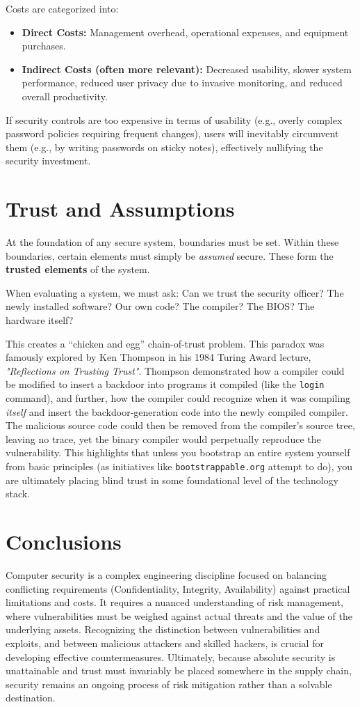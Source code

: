 Costs are categorized into:
\begin{itemize}
    \item \textbf{Direct Costs:} Management overhead, operational expenses, and equipment purchases.
    \item \textbf{Indirect Costs (often more relevant):} Decreased usability, slower system performance, reduced user privacy due to invasive monitoring, and reduced overall productivity.
\end{itemize}

If security controls are too expensive in terms of usability (e.g., overly complex password policies requiring frequent changes), users will inevitably circumvent them (e.g., by writing passwords on sticky notes), effectively nullifying the security investment.

\section{Trust and Assumptions}
At the foundation of any secure system, boundaries must be set. Within these boundaries, certain elements must simply be \textit{assumed} secure. These form the \textbf{trusted elements} of the system. 

When evaluating a system, we must ask: Can we trust the security officer? The newly installed software? Our own code? The compiler? The BIOS? The hardware itself?

This creates a ``chicken and egg'' chain-of-trust problem. This paradox was famously explored by Ken Thompson in his 1984 Turing Award lecture, \textit{"Reflections on Trusting Trust"}. Thompson demonstrated how a compiler could be modified to insert a backdoor into programs it compiled (like the \texttt{login} command), and further, how the compiler could recognize when it was compiling \textit{itself} and insert the backdoor-generation code into the newly compiled compiler. The malicious source code could then be removed from the compiler's source tree, leaving no trace, yet the binary compiler would perpetually reproduce the vulnerability. This highlights that unless you bootstrap an entire system yourself from basic principles (as initiatives like \texttt{bootstrappable.org} attempt to do), you are ultimately placing blind trust in some foundational level of the technology stack.

\section{Conclusions}
Computer security is a complex engineering discipline focused on balancing conflicting requirements (Confidentiality, Integrity, Availability) against practical limitations and costs. It requires a nuanced understanding of risk management, where vulnerabilities must be weighed against actual threats and the value of the underlying assets. Recognizing the distinction between vulnerabilities and exploits, and between malicious attackers and skilled hackers, is crucial for developing effective countermeasures. Ultimately, because absolute security is unattainable and trust must invariably be placed somewhere in the supply chain, security remains an ongoing process of risk mitigation rather than a solvable destination.

